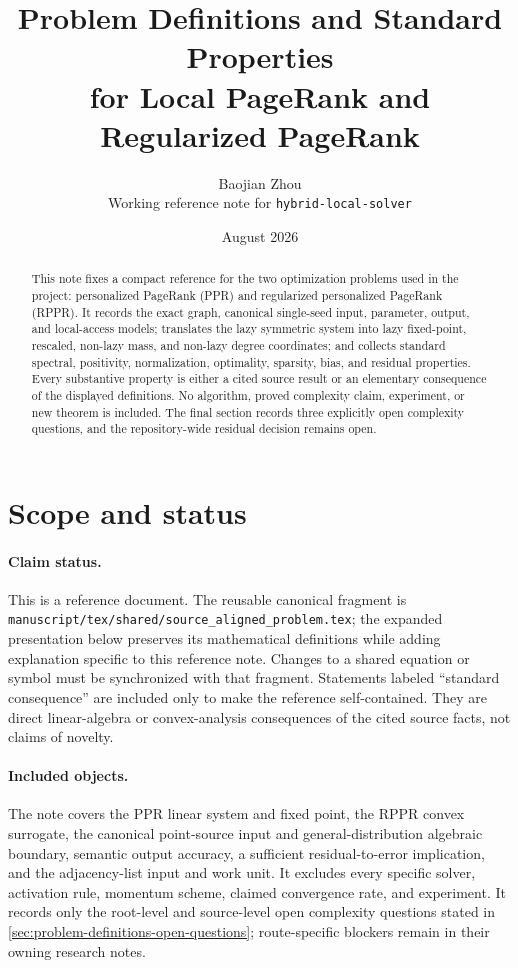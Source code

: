 \documentclass[11pt]{article}
\title{Problem Definitions and Standard Properties\\
for Local PageRank and Regularized PageRank}
\author{Baojian Zhou\\
\small Working reference note for \texttt{hybrid-local-solver}}
\date{August 2026}
\begin{document}
\maketitle

\begin{abstract}
This note fixes a compact reference for the two optimization problems used in
the project: personalized PageRank (PPR) and regularized personalized PageRank
(RPPR).  It records the exact graph, canonical single-seed input, parameter,
output, and local-access models; translates the lazy symmetric system into
lazy fixed-point, rescaled,
non-lazy mass, and non-lazy degree coordinates; and collects standard
spectral, positivity, normalization, optimality, sparsity, bias, and residual
properties.  Every substantive property is either a cited source result or an
elementary consequence of the displayed definitions.  No algorithm, proved
complexity claim, experiment, or new theorem is included.  The final section
records three explicitly open complexity questions, and the repository-wide
residual decision remains open.
\end{abstract}

\section{Scope and status}
\label{sec:problem-definitions-scope}

\paragraph{Claim status.}
This is a \statussource{} reference document.  The reusable canonical fragment
is \texttt{manuscript/tex/shared/source\_aligned\_problem.tex}; the expanded
presentation below preserves its mathematical definitions while adding
explanation specific to this reference note.  Changes to a shared equation or
symbol must be synchronized with that fragment.  Statements labeled
``standard consequence'' are included only to make the reference
self-contained.  They are direct linear-algebra or convex-analysis
consequences of the cited source facts, not claims of novelty.

\paragraph{Included objects.}
The note covers the PPR linear system and fixed point, the RPPR convex
surrogate, the canonical point-source input and general-distribution
algebraic boundary, semantic output accuracy, a sufficient residual-to-error
implication, and the adjacency-list input and work unit.  It excludes every
specific solver, activation rule, momentum scheme, claimed convergence rate,
and experiment.  It records only the root-level and source-level open
complexity questions stated in
\cref{sec:problem-definitions-open-questions}; route-specific blockers remain
in their owning research notes.
\end{document}
